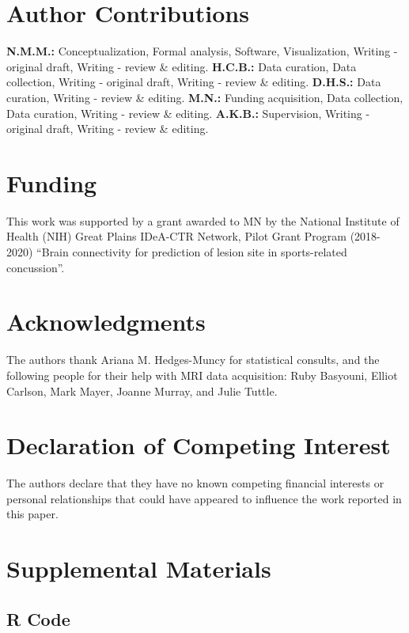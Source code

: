 \documentclass[12pt]{article}
\newcommand{\beginsupplement}{%
	\setcounter{table}{0}
	\renewcommand{\thetable}{S\arabic{table}}%
	\setcounter{figure}{0}
	\renewcommand{\thefigure}{S\arabic{figure}}%
}
\begin{document}
\section*{Author Contributions}
\label{sec:xtr-auth}
\textbf{N.M.M.:} Conceptualization, Formal analysis, Software, Visualization, Writing - original draft, Writing - review \& editing. \textbf{H.C.B.:} Data curation, Data collection, Writing - original draft, Writing - review \& editing. \textbf{D.H.S.:} Data curation, Writing - review \& editing. \textbf{M.N.:} Funding acquisition, Data collection, Data curation, Writing - review \& editing. \textbf{A.K.B.:} Supervision, Writing - original draft, Writing - review \& editing.


\section*{Funding}
\label{sec:xtr-fund}
This work was supported by a grant awarded to MN by the National Institute of Health (NIH) Great Plains IDeA-CTR Network, Pilot Grant Program (2018-2020) ``Brain connectivity for prediction of lesion site in sports-related concussion''.


\section*{Acknowledgments}
\label{sec:xtr-ack}
The authors thank Ariana M. Hedges-Muncy for statistical consults, and the following people for their help with MRI data acquisition: Ruby Basyouni, Elliot Carlson, Mark Mayer, Joanne Murray, and Julie Tuttle.


\section*{Declaration of Competing Interest}
\label{sec:xtr-dci}
The authors declare that they have no known competing financial interests or personal relationships that could have appeared to influence the work reported in this paper.


\pagebreak
\printbibliography
\pagebreak


\section{Supplemental Materials}
\label{sec:supp-materials}
\beginsupplement

\subsection{R Code}
\label{ssec:supp-rcode}
\end{document}
